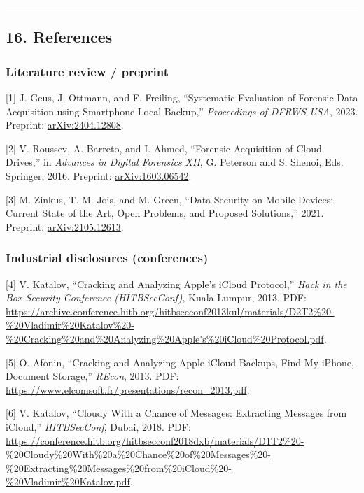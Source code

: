 \documentclass[
  english,
  10pt]{article}
\begin{document}
\begin{center}\rule{0.5\linewidth}{0.5pt}\end{center}

\subsection{16. References}\label{references}

\subsubsection{Literature review /
preprint}\label{literature-review-preprint}

{[}1{]} J. Geus, J. Ottmann, and F. Freiling, ``Systematic Evaluation of
Forensic Data Acquisition using Smartphone Local Backup,''
\emph{Proceedings of DFRWS USA}, 2023. Preprint:
\href{https://arxiv.org/abs/2404.12808}{arXiv:2404.12808}.

{[}2{]} V. Roussev, A. Barreto, and I. Ahmed, ``Forensic Acquisition of
Cloud Drives,'' in \emph{Advances in Digital Forensics XII}, G. Peterson
and S. Shenoi, Eds. Springer, 2016. Preprint:
\href{https://arxiv.org/abs/1603.06542}{arXiv:1603.06542}.

{[}3{]} M. Zinkus, T. M. Jois, and M. Green, ``Data Security on Mobile
Devices: Current State of the Art, Open Problems, and Proposed
Solutions,'' 2021. Preprint:
\href{https://arxiv.org/abs/2105.12613}{arXiv:2105.12613}.

\subsubsection{Industrial disclosures
(conferences)}\label{industrial-disclosures-conferences}

{[}4{]} V. Katalov, ``Cracking and Analyzing Apple's iCloud Protocol,''
\emph{Hack in the Box Security Conference (HITBSecConf)}, Kuala Lumpur,
2013. PDF:
\url{https://archive.conference.hitb.org/hitbsecconf2013kul/materials/D2T2\%20-\%20Vladimir\%20Katalov\%20-\%20Cracking\%20and\%20Analyzing\%20Apple's\%20iCloud\%20Protocol.pdf}.

{[}5{]} O. Afonin, ``Cracking and Analyzing Apple iCloud Backups, Find
My iPhone, Document Storage,'' \emph{REcon}, 2013. PDF:
\url{https://www.elcomsoft.fr/presentations/recon_2013.pdf}.

{[}6{]} V. Katalov, ``Cloudy With a Chance of Messages: Extracting
Messages from iCloud,'' \emph{HITBSecConf}, Dubai, 2018. PDF:
\url{https://conference.hitb.org/hitbsecconf2018dxb/materials/D1T2\%20-\%20Cloudy\%20With\%20a\%20Chance\%20of\%20Messages\%20-\%20Extracting\%20Messages\%20from\%20iCloud\%20-\%20Vladimir\%20Katalov.pdf}.
\end{document}
